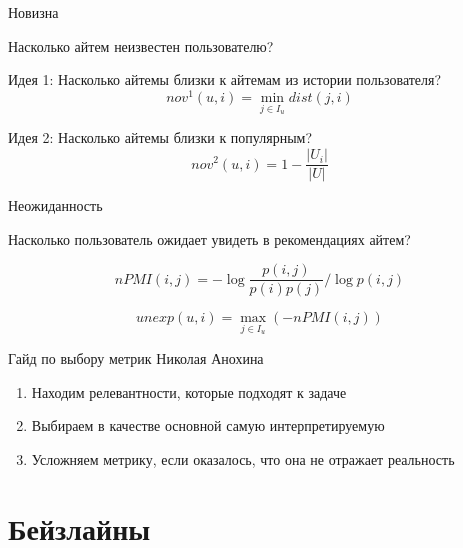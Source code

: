 \documentclass[11pt,aspectratio=169,handout]{beamer}
\begin{document}
\begin{frame}{Новизна}

\begin{tcolorbox}[colback=info!5,colframe=info!80,title=]
[novelty] Насколько айтем неизвестен пользователю?
\end{tcolorbox}

Идея 1: Насколько айтемы близки к айтемам из истории пользователя?
\[
nov^1(u, i) = \min_{j \in I_u} dist(j, i)
\]

Идея 2: Насколько айтемы близки к популярным?
\[
nov^2(u, i) = 1 - \frac{|U_i|}{|U|}
\]

\end{frame}

\begin{frame}{Неожиданность}

\begin{tcolorbox}[colback=info!5,colframe=info!80,title=]
[unexpectedness] Насколько пользователь ожидает увидеть в рекомендациях айтем?
\end{tcolorbox}

\[
nPMI(i, j) = - \log \frac{p(i, j)}{p(i)p(j)} / \log p(i, j)
\]

\[
unexp(u, i) = \max_{j \in I_u} \left( -nPMI(i, j) \right)
\]

\end{frame}

\begin{frame}{Гайд по выбору метрик Николая Анохина}

\begin{enumerate}
\item Находим релевантности, которые подходят к задаче
\item Выбираем в качестве основной самую интерпретируемую
\item Усложняем метрику, если оказалось, что она не отражает реальность
\end{enumerate}

\end{frame}

\section{Бейзлайны}
\end{document}

